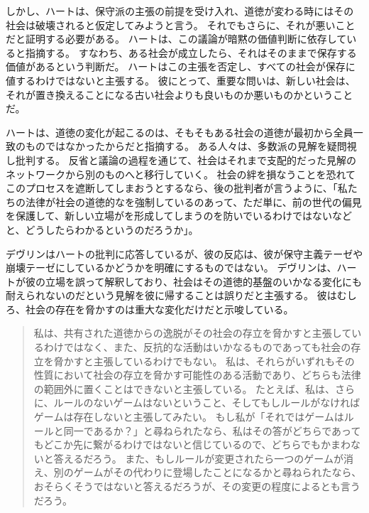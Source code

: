 \documentclass[paper=a4,book,openany]{jlreq}
\newcommand{\ig}[1]{}           %
\begin{document}
しかし、ハートは、保守派の主張の前提を受け入れ、道徳が変わる時にはその社会は破壊されると仮定してみようと言う。
それでもさらに、それが悪いことだと証明する必要がある。
ハートは、この議論が暗黙の価値判断に依存していると指摘する。
すなわち、ある社会が成立したら、それはそのままで保存する価値があるという判断だ。
ハートはこの主張を否定し、すべての社会が保存に値するわけではないと主張する。
彼にとって、重要な問いは、新しい社会は、それが置き換えることになる古い社会よりも良いものか悪いものかということだ。

ハートは、道徳の変化が起こるのは、そもそもある社会の道徳が最初から全員一致のものではなかったからだと指摘する。
ある人々は、多数派の見解を疑問視し批判する。
反省と議論の過程を通じて、社会はそれまで支配的だった見解のネットワークから別のものへと移行していく。
社会の絆を損なうことを恐れてこのプロセスを遮断してしまおうとするなら、後の批判者が言うように、「私たちの法律が社会の道徳的なを強制しているのあって、ただ単に、前の世代の偏見を保護して、新しい立場がを形成してしまうのを防いでいるわけではないなどと、どうしたらわかるというのだろうか」\citep[p.169]{bix00:_juris}。

デヴリン\ig{Patrick Devlin}はハートの批判に応答しているが、彼の反応は、彼が保守主義テーゼや崩壊テーゼにしているかどうかを明確にするものではない。
デヴリン\ig{Patrick Devlin}は、ハートが彼の立場を誤って解釈しており、社会はその道徳的基盤のいかなる変化にも耐えられないのだという見解を彼に帰することは誤りだと主張する。
彼はむしろ、社会の存在を脅かすのは重大な変化だけだと示唆している。

\begin{quote}
私は、共有された道徳からの逸脱がその社会の存立を脅かすと主張しているわけではなく、また、反抗的な活動はいかなるものであっても社会の存立を脅かすと主張しているわけでもない。
私は、それらがいずれもその性質において社会の存立を脅かす可能性のある活動であり、どちらも法律の範囲外に置くことはできないと主張している。
たとえば、私は、さらに、ルールのないゲームはないということ、そしてもしルールがなければゲームは存在しないと主張してみたい。
もし私が「それではゲームはルールと同一であるか？」と尋ねられたなら、私はその答がどちらであってもどこか先に繋がるわけではないと信じているので、どちらでもかまわないと答えるだろう。
また、もしルールが変更されたら一つのゲームが消え、別のゲームがその代わりに登場したことになるかと尋ねられたなら、おそらくそうではないと答えるだろうが、その変更の程度によるとも言うだろう。
\citep[p.37]{devlin65:_enfor_moral}
 \end{quote}
\end{document}
